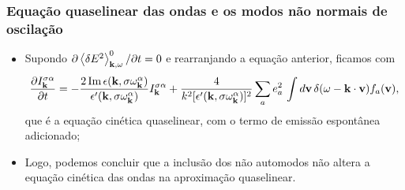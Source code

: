\documentclass[10pt,aspectratio=1610,lualatex]{beamer}
\begin{document}
\begin{frame}
  \frametitle{Equação quaselinear das ondas e os modos não normais de
    oscilação}
  \begin{itemize}
    \item Supondo
    $\partial \left< \delta E^2 \right>_{{\bf k},\omega}^0/\partial
    t=0$ e rearranjando a equação anterior, ficamos com
    \begin{equation*}
      \begin{split}
	\label{eigenmode-ql2}
	\frac{\partial I_{\bf k}^{\sigma \alpha}}{\partial t}
	=-\frac{2\,\mbox{Im}\,\epsilon({\bf k},
	  \sigma\omega_{\bf k}^\alpha)}
	{\epsilon '({\bf k},\sigma\omega_{\bf k}^\alpha)}
	I_{\bf k}^{\sigma \alpha}
	+\frac{4}{k^2[\epsilon '({\bf k},
	  \sigma\omega_{\bf k}^\alpha)]^2} \sum_a e^2_a\,
	\int d{\bf v}\,\delta(\omega-{\bf k \cdot v})f_a({\bf v}),
      \end{split}
    \end{equation*}
    que é a equação cinética quaselinear, com o termo de emissão
    espontânea adicionado;
    \vspace{0.5cm}
    \pause
    \item Logo, podemos concluir que a inclusão dos não automodos
    não altera a equação cinética das ondas na aproximação quaselinear.
  \end{itemize}
\end{frame}
\end{document}
